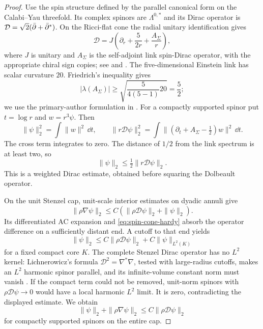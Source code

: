\begin{proof}
Use the spin structure defined by the parallel canonical
form on the Calabi--Yau threefold. Its complex spinors are
$\Lambda^{0,*}$ and its Dirac operator is
$\mathcal D=\sqrt2(\bar\partial+\bar\partial^*)$.
On the Ricci-flat cone the radial unitary identification gives
\begin{equation}\label{eq:cone-spin-dirac}
 \mathcal D=J\left(\partial_r+\frac{5}{2r}
                                    +\frac{A_\Sigma}{r}\right),
\end{equation}
where $J$ is unitary and $A_\Sigma$ is the self-adjoint link
spin-Dirac operator, with the appropriate chiral sign copies;
see \cite[Section 6, (42)]{JSZ} and
\cite[Sections 2.4 and 3]{LM}.
The five-dimensional Einstein link has scalar curvature
$20$. Friedrich's inequality gives
\[
 |\lambda(A_\Sigma)|\ge
             \sqrt{\frac5{4(5-1)}20}=\frac52;
\]
we use the primary-author formulation in \cite{FK}.
For a compactly supported spinor put $t=\log r$ and
$w=r^3\psi$. Then
\[
 \|\psi\|_2^2=\int\|w\|^2\,\dd t,\qquad
 \|r\mathcal D\psi\|_2^2
 =\int\|(\partial_t+A_\Sigma-\tfrac12)w\|^2\,\dd t.
\]
The cross term integrates to zero. The distance of $1/2$
from the link spectrum is at least two, so
\begin{equation}\label{eq:spin-cone-hardy}
 \|\psi\|_2\le\tfrac12\|r\mathcal D\psi\|_2.
\end{equation}
This is a weighted Dirac estimate, obtained before squaring
the Dolbeault operator.

On the unit Stenzel cap, unit-scale interior estimates on
dyadic annuli give
\[
 \|\rho\nabla\psi\|_2
                  \le C(\|\rho\mathcal D\psi\|_2+\|\psi\|_2).
\]
Its differentiated AC expansion and
\eqref{eq:spin-cone-hardy} absorb the operator difference
on a sufficiently distant end. A cutoff to that end yields
\[
 \|\psi\|_2\le C\|\rho\mathcal D\psi\|_2
                                     +C\|\psi\|_{L^2(K)}
\]
for a fixed compact core $K$. The complete Stenzel Dirac
operator has no $L^2$ kernel: Lichnerowicz's formula
$\mathcal D^2=\nabla^*\nabla$, tested with large-radius
cutoffs, makes an $L^2$ harmonic spinor parallel, and its
infinite-volume constant norm must vanish
\cite[(2.14)]{GL}. If the compact term could not be removed,
unit-norm spinors with $\rho\mathcal D\psi\to0$ would
have a local harmonic $L^2$ limit. It is zero, contradicting
the displayed estimate. We obtain
\begin{equation}\label{eq:stenzel-spin-estimate}
 \|\psi\|_2+\|\rho\nabla\psi\|_2
                       \le C\|\rho\mathcal D\psi\|_2
\end{equation}
for compactly supported spinors on the entire cap.


\end{proof}

